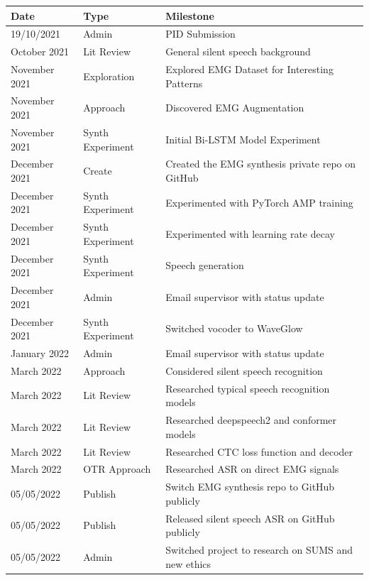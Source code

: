 {\small\begin{center}
    \begin{tabularx}{\textwidth}{ l l l }
        Date & Type & Milestone \\
        \hline
        19/10/2021 & Admin & PID Submission \\
        October 2021 & Lit Review & General silent speech background \\
        November 2021 & Exploration & Explored EMG Dataset for Interesting Patterns \\
        November 2021 & Approach & Discovered EMG Augmentation \\
        November 2021 & Synth Experiment & Initial Bi-LSTM Model Experiment \\
        December 2021 & Create & Created the EMG synthesis private repo on GitHub \\
        December 2021 & Synth Experiment & Experimented with PyTorch AMP training \\
        December 2021 & Synth Experiment & Experimented with learning rate decay \\
        December 2021 & Synth Experiment & Speech generation \\
        December 2021 & Admin & Email supervisor with status update \\
        December 2021 & Synth Experiment & Switched vocoder to WaveGlow \\
        January 2022 & Admin & Email supervisor with status update \\
        March 2022 & Approach & Considered silent speech recognition \\
        March 2022 & Lit Review & Researched typical speech recognition models \\
        March 2022 & Lit Review & Researched deepspeech2 and conformer models \\
        March 2022 & Lit Review & Researched CTC loss function and decoder \\
        March 2022 & OTR Approach & Researched ASR on direct EMG signals \\
        05/05/2022 & Publish & Switch EMG synthesis repo to GitHub publicly \\
        05/05/2022 & Publish & Released silent speech ASR on GitHub publicly \\
        05/05/2022 & Admin & Switched project to research on SUMS and new ethics
    \end{tabularx}
\end{center}}

